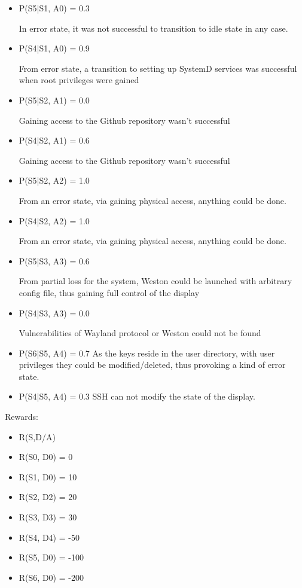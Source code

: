 \begin{itemize}
\item P(S5|S1, A0) = 0.3

In error state, it was not successful to transition to idle state in any case.
\item P(S4|S1, A0) = 0.9

From error state, a transition to setting up SystemD services was successful when root privileges were gained
\item P(S5|S2, A1) = 0.0

Gaining access to the Github repository wasn't successful
\item P(S4|S2, A1) = 0.6

Gaining access to the Github repository wasn't successful
\item P(S5|S2, A2) = 1.0

From an error state, via gaining physical access, anything could be done.
\item P(S4|S2, A2) = 1.0

From an error state, via gaining physical access, anything could be done.
\item P(S5|S3, A3) = 0.6

From partial loss for the system, Weston could be launched with arbitrary config file, thus gaining full control of the display
\item P(S4|S3, A3) = 0.0

Vulnerabilities of Wayland protocol or Weston could not be found

\item P(S6|S5, A4) = 0.7
As the keys reside in the user directory, with user privileges they could be modified/deleted, thus provoking a kind of error state.
\item P(S4|S5, A4) = 0.3
SSH can not modify the state of the display.
\end{itemize}
Rewards:
\begin{itemize}


\item R(S,D/A)
\item R(S0, D0) = 0
\item R(S1, D0) = 10
\item R(S2, D2) = 20
\item R(S3, D3) = 30
\item R(S4, D4) = -50
\item R(S5, D0) = -100
\item R(S6, D0) = -200
\end{itemize}
